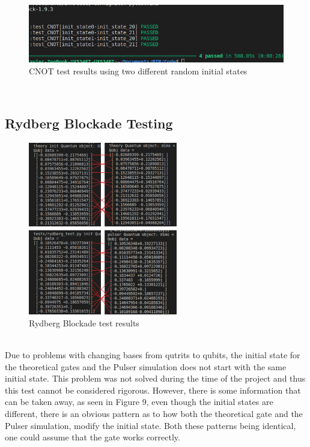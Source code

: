 \begin{figure}[H]
    \centering
    \includegraphics[width=150mm]{Images/CNOT.png}\hfill
    \caption{CNOT test results using two different random initial states}
    \label{fig:CNOT}
\end{figure}
 \textcolor{white}{h}


\newpage

\subsection{Rydberg Blockade Testing}
\begin{figure}

    \includegraphics[width=65mm]{./Images/rydbergtest.png}
    \caption{Rydberg Blockade test results} 
    \label{fig:rydbergtest}
  
\end{figure}
\textcolor{white}{h}\\
Due to problems with changing bases from qutrits to qubits, the initial state for the theoretical gates and the Pulser simulation does not start with the same initial state.
This problem was not solved during the time of the project and thus this test cannot be considered rigorous.
However, there is some information that can be taken away, as seen in Figure 9, even though the initial states are different,
there is an obvious pattern as to how both the theoretical gate and the Pulser simulation, modify the initial state.
Both these patterns being identical, one could assume that the gate works correctly.\\\\\\\\\\





